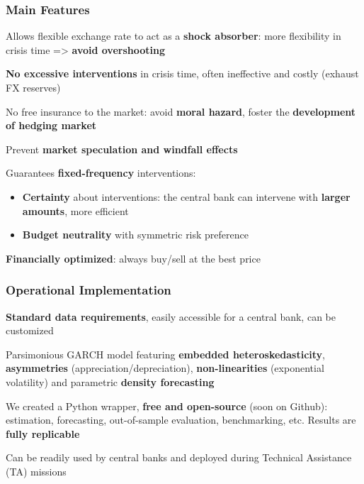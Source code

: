 \documentclass{beamer}
\newenvironment{largeitemize}{\itemize\addtolength{\itemsep}{10pt}}{\enditemize}
\newenvironment{largeenumerate}{\enumerate\addtolength{\itemsep}{10pt}}{\endenumerate}
\begin{document}
\begin{frame}
    \frametitle{Main Features}
  \begin{largeenumerate}
  \item Allows flexible exchange rate to act as a \textbf{shock absorber}:
    more flexibility in crisis time => \textbf{avoid overshooting}
  \item \textbf{No excessive interventions} in crisis time, often ineffective
    and costly (exhaust FX reserves)
  \item No free insurance to the market: avoid \textbf{moral
      hazard}, foster the \textbf{development of hedging market}
  \item Prevent \textbf{market speculation and windfall effects}
  \item Guarantees \textbf{fixed-frequency} interventions: 
    \begin{itemize}
    \item \textbf{Certainty} about interventions: the central bank can intervene with
      \textbf{larger amounts}, more efficient
    \item \textbf{Budget neutrality} with symmetric risk preference
    \end{itemize}

  \item \textbf{Financially optimized}: always buy/sell at the best price
  \end{largeenumerate}  
\end{frame}


\begin{frame}
  \frametitle{Operational Implementation}
  \begin{largeitemize}
  \item \textbf{Standard data requirements}, easily accessible for a central
    bank, can be customized
  \item Parsimonious GARCH model featuring \textbf{embedded heteroskedasticity},  \textbf{asymmetries}
    (appreciation/depreciation), \textbf{non-linearities} (exponential
    volatility) and parametric \textbf{density forecasting}    
  \item We created a Python wrapper, \textbf{free and open-source}  (soon on Github): estimation, forecasting,
    out-of-sample evaluation, benchmarking, etc. Results are \textbf{fully replicable}
  \item Can be readily used by central banks and deployed during Technical
    Assistance (TA) missions
  \end{largeitemize}
\end{frame}
\end{document}
